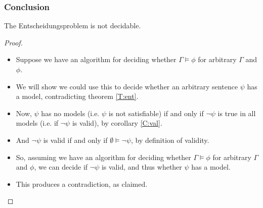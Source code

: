 \documentclass[handout]{beamer}
\begin{document}
\begin{frame}
\frametitle{Conclusion} 
\begin{corollary}
The Entscheidungsproblem is not decidable.
\end{corollary} 
\begin{proof}
\begin{itemize}
\item Suppose we have an algorithm for deciding whether $\Gamma\models \phi$ for arbitrary $\Gamma$ and $\phi$. 
\item We will show we could use this to decide whether an arbitrary sentence $\psi$ has a model, contradicting theorem \ref{T:ent}. 
\item Now, $\psi$ has no models (i.e. $\psi$ is not satisfiable) if and only if $\neg \psi$ is true in all models (i.e. if $\neg \psi$ is valid), by corollary \ref{C:val}. 
\item And $\neg\psi$ is valid if and only if $\emptyset\models \neg\psi$, by definition of validity. 
\item So, assuming we have an algorithm for deciding whether $\Gamma\models \phi$ for arbitrary $\Gamma$ and $\phi$, we can decide if $\neg\psi$ is valid, and thus whether $\psi$ has a model. 
\item This produces a contradiction, as claimed.
\end{itemize}
\end{proof}

\end{frame}
\end{document}
